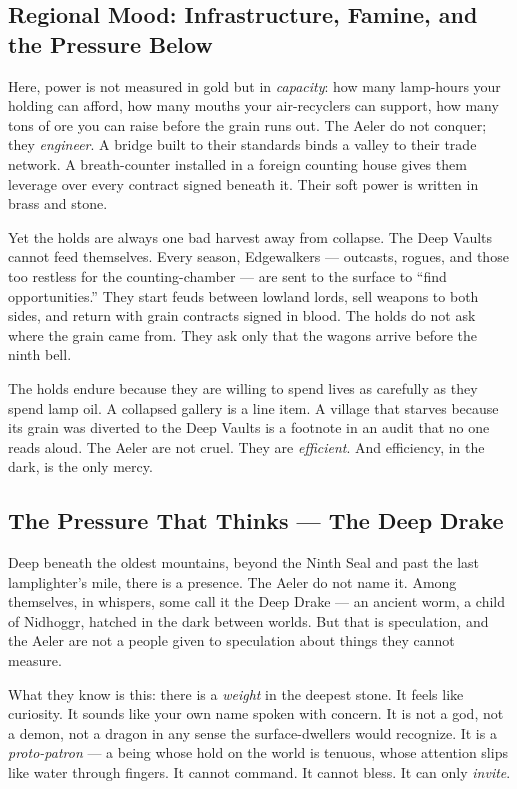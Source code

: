 \subsection*{Regional Mood: Infrastructure, Famine, and the Pressure Below}

Here, power is not measured in gold but in \textit{capacity}: how many lamp-hours your holding can afford, how many mouths your air-recyclers can support, how many tons of ore you can raise before the grain runs out. The Aeler do not conquer; they \textit{engineer}. A bridge built to their standards binds a valley to their trade network. A breath-counter installed in a foreign counting house gives them leverage over every contract signed beneath it. Their soft power is written in brass and stone.

Yet the holds are always one bad harvest away from collapse. The Deep Vaults cannot feed themselves. Every season, Edgewalkers --- outcasts, rogues, and those too restless for the counting-chamber --- are sent to the surface to ``find opportunities.'' They start feuds between lowland lords, sell weapons to both sides, and return with grain contracts signed in blood. The holds do not ask where the grain came from. They ask only that the wagons arrive before the ninth bell.

The holds endure because they are willing to spend lives as carefully as they spend lamp oil. A collapsed gallery is a line item. A village that starves because its grain was diverted to the Deep Vaults is a footnote in an audit that no one reads aloud. The Aeler are not cruel. They are \textit{efficient}. And efficiency, in the dark, is the only mercy.

\subsection*{The Pressure That Thinks --- The Deep Drake}
\label{sec:aeler-deep-drake}

Deep beneath the oldest mountains, beyond the Ninth Seal and past the last lamplighter's mile, there is a presence. The Aeler do not name it. Among themselves, in whispers, some call it the Deep Drake --- an ancient worm, a child of Nidhoggr, hatched in the dark between worlds. But that is speculation, and the Aeler are not a people given to speculation about things they cannot measure.

What they know is this: there is a \textit{weight} in the deepest stone. It feels like curiosity. It sounds like your own name spoken with concern. It is not a god, not a demon, not a dragon in any sense the surface-dwellers would recognize. It is a \textit{proto-patron} --- a being whose hold on the world is tenuous, whose attention slips like water through fingers. It cannot command. It cannot bless. It can only \textit{invite}.

